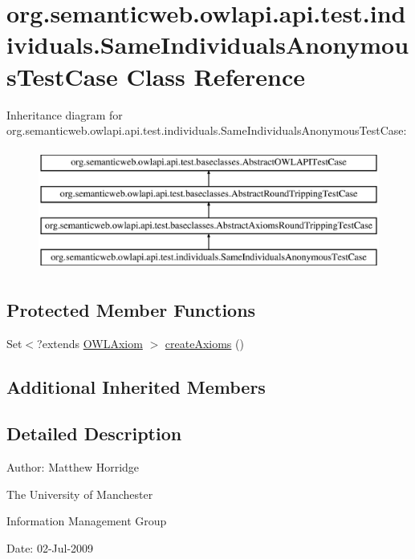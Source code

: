 \hypertarget{classorg_1_1semanticweb_1_1owlapi_1_1api_1_1test_1_1individuals_1_1_same_individuals_anonymous_test_case}{\section{org.\-semanticweb.\-owlapi.\-api.\-test.\-individuals.\-Same\-Individuals\-Anonymous\-Test\-Case Class Reference}
\label{classorg_1_1semanticweb_1_1owlapi_1_1api_1_1test_1_1individuals_1_1_same_individuals_anonymous_test_case}
}
Inheritance diagram for org.\-semanticweb.\-owlapi.\-api.\-test.\-individuals.\-Same\-Individuals\-Anonymous\-Test\-Case\-:\begin{figure}[H]
\begin{center}
\leavevmode
\includegraphics[height=4.000000cm]{classorg_1_1semanticweb_1_1owlapi_1_1api_1_1test_1_1individuals_1_1_same_individuals_anonymous_test_case}
\end{center}
\end{figure}
\subsection*{Protected Member Functions}
\begin{DoxyCompactItemize}
\item 
Set$<$?extends \hyperlink{interfaceorg_1_1semanticweb_1_1owlapi_1_1model_1_1_o_w_l_axiom}{O\-W\-L\-Axiom} $>$ \hyperlink{classorg_1_1semanticweb_1_1owlapi_1_1api_1_1test_1_1individuals_1_1_same_individuals_anonymous_test_case_ae289fc762267ac73714b4d5a0e6aabdb}{create\-Axioms} ()
\end{DoxyCompactItemize}
\subsection*{Additional Inherited Members}


\subsection{Detailed Description}
Author\-: Matthew Horridge\par
 The University of Manchester\par
 Information Management Group\par
 Date\-: 02-\/\-Jul-\/2009 

